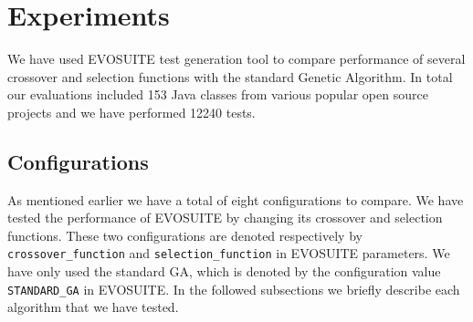 \documentclass[sigconf]{acmart}
\begin{document}


\section{Experiments}
\label{experiments}
We have used EVOSUITE test generation tool to compare performance of several crossover 
and selection functions with the standard Genetic Algorithm. 
In total our evaluations included 153 Java classes from various popular open source projects 
and we have performed 12240 tests. 

\subsection{Configurations}
As mentioned earlier we have a total of eight configurations to compare. We have tested the performance
of EVOSUITE by changing its crossover and selection functions. These two configurations are
denoted respectively by \verb|crossover_function| and \verb|selection_function| in EVOSUITE parameters. 
We have only used the standard GA, which is denoted by the configuration value \verb|STANDARD_GA| in EVOSUITE.
In the followed subsections we briefly describe each algorithm that we have tested.
\end{document}
